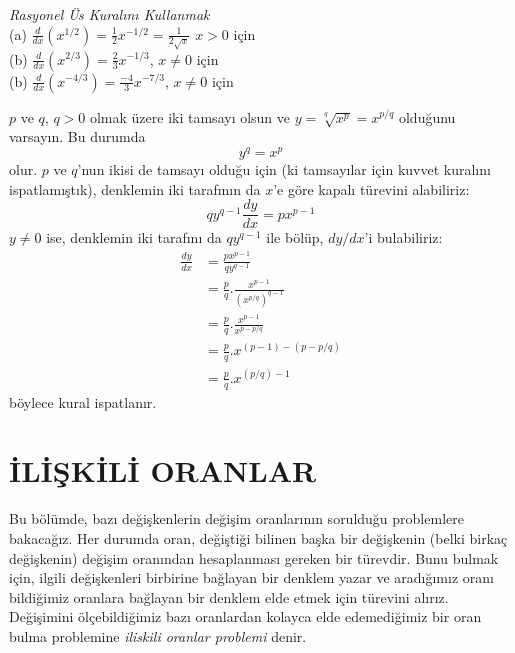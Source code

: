 \begin{ornek}\textit{Rasyonel Üs Kuralını Kullanmak}\\
(a) $\displaystyle \frac{d}{dx}(x^{1/2})=\frac{1}{2}x^{-1/2}=\frac{1}{2\sqrt{x}}$ $x>0$ için\\
(b) $\displaystyle \frac{d}{dx}(x^{2/3})=\frac{2}{3}x^{-1/3}$,		 $x\ne 0$ için\\
(b) $\displaystyle \frac{d}{dx}(x^{-4/3})=\frac{-4}{3}x^{-7/3}$,	    $x\ne 0$ için
\end{ornek}

\begin{ispat}
	$p$ ve $q$, $q>0$ olmak üzere iki tamsayı olsun ve $y=\sqrt[q]{x^p}=x^{p/q}$ olduğunu varsayın. Bu durumda
	\begin{equation*}
	y^q=x^p
	\end{equation*}
olur. $p$ ve $q$'nun ikisi de tamsayı olduğu için (ki tamsayılar için kuvvet kuralını ispatlamıştık), denklemin iki tarafının da $x$'e göre kapalı türevini alabiliriz:
	\begin{equation*}
	qy^{q-1} \frac{dy}{dx}=px^{p-1}
	\end{equation*}
$y \ne 0$ ise, denklemin iki tarafını da $qy^{q-1}$ ile bölüp, $dy/dx$'i bulabiliriz:
	\begin{equation*}
	\begin{split}
	\frac{dy}{dx}&=\frac{px^{p-1}}{qy^{q-1}}\\
	&=\frac{p}{q}. \frac{x^{p-1}}{(x^{p/q})^{q-1}}\\
	&=\frac{p}{q}.\frac{x^{p-1}}{x^{p-p/q}}\\
	&=\frac{p}{q}.x^{(p-1)-(p-p/q)}\\
	&=\frac{p}{q}.x^{(p/q)-1}
	\end{split}
	\end{equation*}
böylece kural ispatlanır.
\end{ispat}
\chapter{\protect İLİŞKİLİ ORANLAR}
Bu bölümde, bazı değişkenlerin değişim oranlarının sorulduğu problemlere bakacağız. Her durumda oran, değiştiği bilinen başka bir değişkenin (belki birkaç değişkenin) değişim oranından hesaplanması gereken bir türevdir. Bunu bulmak için, ilgili değişkenleri birbirine bağlayan bir denklem yazar ve aradığımız oranı bildiğimiz oranlara bağlayan bir denklem elde etmek için türevini alırız. Değişimini ölçebildiğimiz bazı oranlardan kolayca elde edemediğimiz bir oran bulma problemine \textit{iliskili oranlar problemi} denir.

